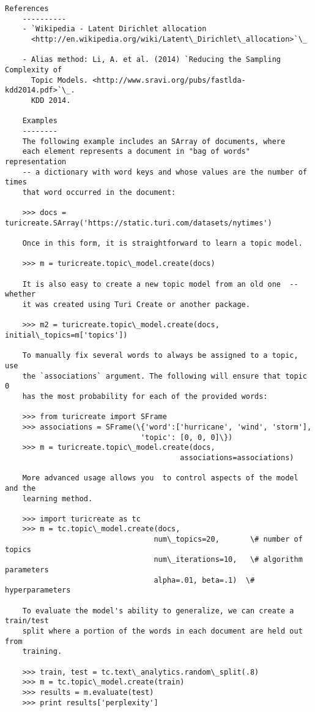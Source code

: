 \documentclass[11pt]{ctexart}
\begin{document}
\begin{Verbatim}[commandchars=\\\{\}]
    References
    ----------
    - `Wikipedia - Latent Dirichlet allocation
      <http://en.wikipedia.org/wiki/Latent\_Dirichlet\_allocation>`\_
    
    - Alias method: Li, A. et al. (2014) `Reducing the Sampling Complexity of
      Topic Models. <http://www.sravi.org/pubs/fastlda-kdd2014.pdf>`\_.
      KDD 2014.
    
    Examples
    --------
    The following example includes an SArray of documents, where
    each element represents a document in "bag of words" representation
    -- a dictionary with word keys and whose values are the number of times
    that word occurred in the document:
    
    >>> docs = turicreate.SArray('https://static.turi.com/datasets/nytimes')
    
    Once in this form, it is straightforward to learn a topic model.
    
    >>> m = turicreate.topic\_model.create(docs)
    
    It is also easy to create a new topic model from an old one  -- whether
    it was created using Turi Create or another package.
    
    >>> m2 = turicreate.topic\_model.create(docs, initial\_topics=m['topics'])
    
    To manually fix several words to always be assigned to a topic, use
    the `associations` argument. The following will ensure that topic 0
    has the most probability for each of the provided words:
    
    >>> from turicreate import SFrame
    >>> associations = SFrame(\{'word':['hurricane', 'wind', 'storm'],
                               'topic': [0, 0, 0]\})
    >>> m = turicreate.topic\_model.create(docs,
                                        associations=associations)
    
    More advanced usage allows you  to control aspects of the model and the
    learning method.
    
    >>> import turicreate as tc
    >>> m = tc.topic\_model.create(docs,
                                  num\_topics=20,       \# number of topics
                                  num\_iterations=10,   \# algorithm parameters
                                  alpha=.01, beta=.1)  \# hyperparameters
    
    To evaluate the model's ability to generalize, we can create a train/test
    split where a portion of the words in each document are held out from
    training.
    
    >>> train, test = tc.text\_analytics.random\_split(.8)
    >>> m = tc.topic\_model.create(train)
    >>> results = m.evaluate(test)
    >>> print results['perplexity']


    \end{Verbatim}
\end{document}
